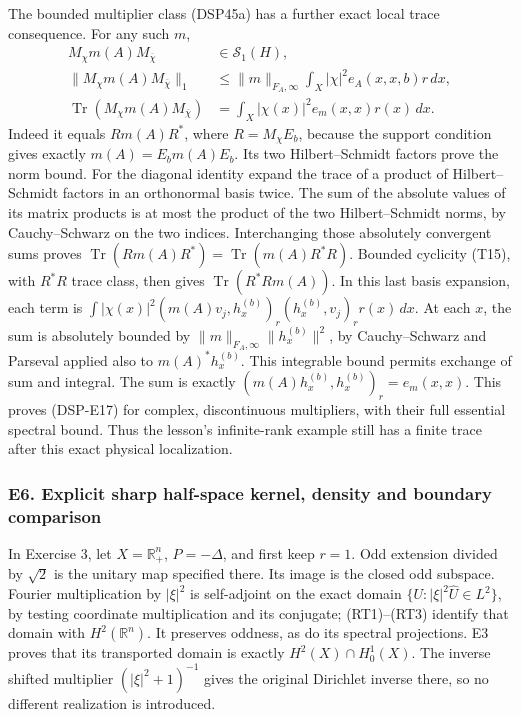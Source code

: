 \documentclass[
  11pt,
]{article}
\makeatletter
\let\ReaderOriginalAnchorStart\hyper@anchorstart
\let\ReaderOriginalAnchorEnd\hyper@anchorend
\let\ReaderPendingAliases\@empty
\def\ReaderArmAliases#1{\gdef\ReaderPendingAliases{#1}}
\def\hyper@anchorstart#1{\ReaderIfNativeAnchorTF{#1}{\ReaderPendingAliases\global\let\ReaderPendingAliases\@empty}{}\ReaderOriginalAnchorStart{#1}}
\makeatother
\begin{document}
The bounded multiplier class (DSP45a) has a further exact local trace
consequence. For any such \(m\), \[
 \begin{split}
 M_\chi m(A)M_{\overline\chi}&\in\mathcal S_1(H),\\
 \|M_\chi m(A)M_{\overline\chi}\|_1
 &\leq\|m\|_{F_A,\infty}\int_X|\chi|^2e_A(x,x,b)r\,dx,\\
 \operatorname{Tr}(M_\chi m(A)M_{\overline\chi})
 &=\int_X|\chi(x)|^2e_m(x,x)r(x)\,dx.
 \end{split}\tag{DSP-E17}
\] Indeed it equals \(Rm(A)R^*\), where \(R=M_\chi E_b\), because the
support condition gives exactly \(m(A)=E_bm(A)E_b\). Its two
Hilbert--Schmidt factors prove the norm bound. For the diagonal identity
expand the trace of a product of Hilbert--Schmidt factors in an
orthonormal basis twice. The sum of the absolute values of its matrix
products is at most the product of the two Hilbert--Schmidt norms, by
Cauchy--Schwarz on the two indices. Interchanging those absolutely
convergent sums proves
\(\operatorname{Tr}(Rm(A)R^*)=\operatorname{Tr}(m(A)R^*R)\). Bounded
cyclicity (T15), with \(R^*R\) trace class, then gives
\(\operatorname{Tr}(R^*Rm(A))\). In this last basis expansion, each term
is \(\int|\chi(x)|^2(m(A)v_j,h_x^{(b)})_r(h_x^{(b)},v_j)_r r(x)\,dx\).
At each \(x\), the sum is absolutely bounded by
\(\|m\|_{F_A,\infty}\|h_x^{(b)}\|^2\), by Cauchy--Schwarz and Parseval
applied also to \(m(A)^*h_x^{(b)}\). This integrable bound permits
exchange of sum and integral. The sum is exactly
\((m(A)h_x^{(b)},h_x^{(b)})_r=e_m(x,x)\). This proves (DSP-E17) for
complex, discontinuous multipliers, with their full essential spectral
bound. Thus the lesson's infinite-rank example still has a finite trace
after this exact physical localization.

\ReaderArmAliases{\ReaderOriginalAnchorStart{e6.-explicit-sharp-half-space-kernel-density-and-boundary-comparison}\ReaderOriginalAnchorEnd}
\subsubsection{E6. Explicit sharp half-space kernel, density and
boundary
comparison}\label{e6.-explicit-sharp-half-space-kernel-density-and-boundary-comparison}

In Exercise 3, let \(X=\mathbb R^n_+\), \(P=-\Delta\), and first keep
\(r=1\). Odd extension divided by \(\sqrt2\) is the unitary map
specified there. Its image is the closed odd subspace. Fourier
multiplication by \(|\xi|^2\) is self-adjoint on the exact domain
\(\{U:|\xi|^2\widehat U\in L^2\}\), by testing coordinate multiplication
and its conjugate; (RT1)--(RT3) identify that domain with
\(H^2(\mathbb R^n)\). It preserves oddness, as do its spectral
projections. E3 proves that its transported domain is exactly
\(H^2(X)\cap H_0^1(X)\). The inverse shifted multiplier
\((|\xi|^2+1)^{-1}\) gives the original Dirichlet inverse there, so no
different realization is introduced.
\end{document}
